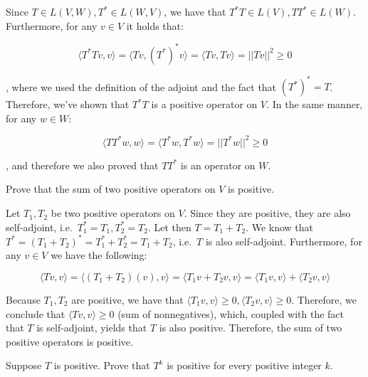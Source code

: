 \begin{solution}

    Since $T \in L(V, W), T^* \in L(W, V)$, we have that $T^*T \in L(V), TT^* \in L(W)$. Furthermore, for any $v \in V$ it holds that:

    $$\langle T^*Tv, v \rangle = \langle Tv, (T^*)^*v \rangle = \langle Tv, Tv \rangle = \lvert \lvert Tv \rvert \rvert^2 \geq 0$$

    , where we used the definition of the adjoint and the fact that $(T^*)^* = T$. Therefore, we've shown that $T^*T$ is a positive operator on $V$. In the same manner, for any $w \in W$:

    $$\langle TT^*w, w \rangle = \langle T^*w, T^*w \rangle = \lvert \lvert T^* w\rvert \rvert^2 \geq 0$$

    , and therefore we also proved that $TT^*$ is an operator on $W$.
\end{solution}

\begin{exercise}{5}
    Prove that the sum of two positive operators on $V$ is positive.
\end{exercise}

\begin{solution}

    Let $T_1, T_2$ be two positive operators on $V$. Since they are positive, they are also self-adjoint, i.e.\ $T_1^* = T_1, T_2^* = T_2$. Let then $T = T_1 + T_2$. We know that $T^* = (T_1 + T_2)^* = T_1^* + T_2^* = T_1 + T_2$, i.e.\ $T$ is also self-adjoint. Furthermore, for any $v \in V$ we have the following:

    $$\langle Tv, v \rangle = \langle (T_1 + T_2)(v), v \rangle = \langle T_1v + T_2v, v \rangle = \langle T_1v, v \rangle + \langle T_2v, v \rangle $$

    Because $T_1, T_2$ are positive, we have that $\langle T_1v, v \rangle \geq 0, \langle T_2v, v \rangle \geq 0$. Therefore, we conclude that $\langle Tv, v \rangle \geq 0$ (sum of nonnegatives), which, coupled with the fact that $T$ is self-adjoint, yields that $T$ is also positive. Therefore, the sum of two positive operators is positive.
\end{solution}

\begin{exercise}{6}
    Suppose $T$ is positive. Prove that $T^k$ is positive for every positive integer $k$.
\end{exercise}

